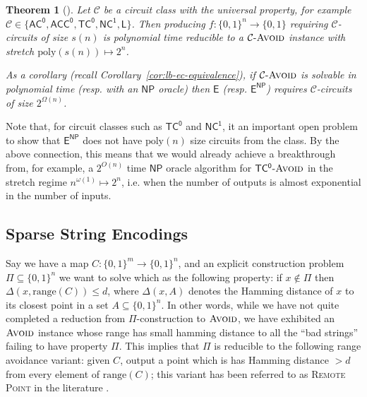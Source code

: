 \documentclass[11pt]{article}
\newtheorem{theorem}{Theorem}
\newcommand{\dash}{\text{-}}
\newcommand{\B}{\{0,1\}}
\newcommand{\rng}{\mathrm{range}}
\newcommand{\poly}{\mathrm{poly}}
\newcommand{\avoid}{\textsc{Avoid}}
\begin{document}
\begin{theorem}[\cite{RSW}]\label{thm:strong-tt-to-avoid}
Let $\mathcal{C}$ be a circuit class with the universal property, for example $\mathcal{C} \in \{\mathsf{AC^0},\mathsf{ACC^0}, \mathsf{TC^0}, \mathsf{NC^1}, \mathsf{L}\}$. Then producing $f: \B^n \to \B$ requiring $\mathcal{C}$-circuits of size $s(n)$ is polynomial time reducible to a $\mathcal{C}\dash \avoid$ instance with stretch ${\poly(s(n))} \mapsto {2^n}$.

As a corollary (recall Corollary~\ref{cor:lb-ec-equivalence}), if $\mathcal{C}\dash\avoid$ is solvable in polynomial time (resp. with an $\mathsf{NP}$ oracle) then $\mathsf{E}$ (resp. $\mathsf{E^{NP}}$) requires $\mathcal{C}$-circuits of size $2^{\Omega(n)}$.
\end{theorem}

Note that, for circuit classes such as $\mathsf{TC^0}$ and $ \mathsf{NC^1}$, it an important open problem to show that $\mathsf{E^{NP}}$ does not have $\poly(n)$ size circuits from the class. By the above connection, this means that we would already achieve a breakthrough from, for example, a $2^{O(n)}$ time $\mathsf{NP}$ oracle algorithm for $\mathsf{TC^0}\dash\avoid$ in the stretch regime $n^{\omega(1)} \mapsto 2^n$, i.e. when the number of outputs is almost exponential in the number of inputs.

\subsection{Sparse String Encodings}\label{sec:sparse}
Say we have a map $C: \B^m \to \B^n$, and an explicit construction problem $\Pi \subseteq \B^n$ we want to solve which as the following property: if $x \notin \Pi$ then $\Delta(x, \rng(C)) \leq d$, where $\Delta(x, A)$ denotes the Hamming distance of $x$ to its closest point in a set $A \subseteq \B^n$. In other words, while we have not quite completed a reduction from $\Pi$-construction to $\avoid$, we have exhibited an $\avoid$ instance whose range has small hamming distance to all the ``bad strings'' failing to have property $\Pi$. This implies that $\Pi$ is reducible to the following range avoidance variant: given $C$, output a point which is has Hamming distance $> d$ from every element of $\rng(C)$; this variant has been referred to as \textsc{Remote Point} in the literature \cite{hard-partial}.
\end{document}
